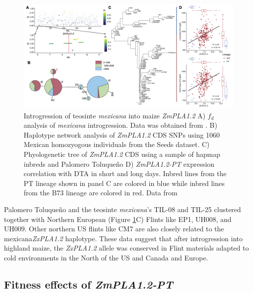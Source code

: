 \documentclass[9pt,twocolumn,twoside]{BioRxiv}
\begin{document}
\begin{figure}[ht]
\begin{center}
\includegraphics[width=0.8\paperwidth]{Figures/Fig_5.png}
\caption{Introgression of teosinte \textit{mexicana} into maize \textit{ZmPLA1.2}  
A) \(f_d\) analysis of \textit{mexicana} introgression. Data was obtained from \cite{Gonzalez-Segovia2019-jy}. 
B) Haplotype network analysis of \textit{ZmPLA1.2} CDS SNPs using 1060 Mexican homozyogous individuals from the Seeds dataset.
C) Phyologenetic tree of \textit{ZmPLA1.2} CDS using a sample of hapmap inbreds and Palomero Toluqueño
D) \textit{ZmPLA1.2-PT} expression correlation with DTA in short and long days. Inbred lines from the PT lineage shown in panel C are colored in blue while inbred lines from the B73 lineage are colored in red.
Data from \cite{Kremling2018-gn}}
\label{Fig5}
\end{center}
\end{figure} 

Palomero Toluqueño and the teosinte \textit{mexicana}'s TIL-08 and TIL-25 clustered together with Northern European (Figure \ref{Fig5}C) Flints like EP1, UH008, and UH009. 
Other northern US flints like CM7 are also closely related to the mexicana\textit{ZxPLA1.2} haplotype. 
These data suggest that after introgression into highland maize, the \textit{ZxPLA1.2} allele was conserved in Flint materials adapted to cold environments in the North of the US and Canada and Europe. 

\subsection{Fitness effects of \textit{ZmPLA1.2-PT}}
\end{document}
